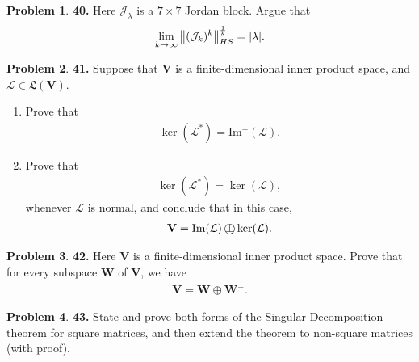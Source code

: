 \documentclass{article}
\theoremstyle{definition}
\newtheorem*{prob*}{Problem}
\newcommand{\V}{\mathbf{V}}
\newcommand{\W}{\mathbf{W}}
\newcommand*{\operp}{\perp\mkern-20.7mu\bigcirc}
\newcommand{\lag}{\mathcal{L}}
\newcommand{\ima}{\text{Im}}
\newcommand{\jor}{\mathcal{J}}
\newcommand{\LL}{\mathfrak{L}}
\begin{document}
\newpage


\begin{prob*}\textbf{40.} Here $\jor_\lambda$ is a $7\times 7$ Jordan block. Argue that
	\begin{align*}
	\lim_{k\to\infty} \norm{(\jor_k)^k}^{\frac{1}{k}}_{HS} = \abs{\lambda}.
	\end{align*}
	
\end{prob*}





\newpage



\begin{prob*}\textbf{41.} Suppose that $\V$ is a finite-dimensional inner product space, and $\lag \in \LL(\V)$. 
	
	\begin{enumerate}
		\item Prove that 
		\begin{align*}
		\ker(\lag^*) = \ima^\perp(\lag).
		\end{align*}
		
		
		\item Prove that 
		\begin{align*}
		\ker(\lag^*) = \ker(\lag),
		\end{align*}
		whenever $\lag$ is normal, and conclude that in this case, 
		\begin{align*}
		\V = \ima(\lag) \operp \ker(\lag).
		\end{align*}
	\end{enumerate}
	
\end{prob*}






\newpage


\begin{prob*}\textbf{42.} Here $\V$ is a finite-dimensional inner product space. Prove that for every subspace $\W$ of $\V$, we have
	\begin{align*}
	\V = \W \oplus \W^\perp.
	\end{align*}

\end{prob*}





\newpage



\begin{prob*}\textbf{43.} State and prove both forms of the Singular Decomposition theorem for square matrices, and then extend the theorem to non-square matrices (with proof). 
	
\end{prob*}
\end{document}
